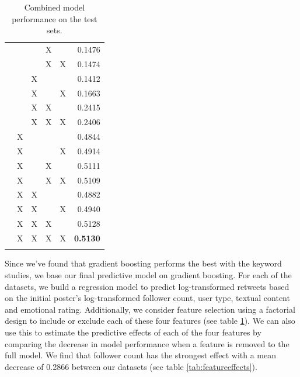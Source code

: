 \begin{longtable}{l|c|c|c|c|r}
                           &           &           & X    &         & 0.1476                           \\ \cline{2-6} 
                           &           &           & X    & X       & 0.1474                           \\ \cline{2-6} 
                           &           & X         &      &         & 0.1412                           \\ \cline{2-6} 
                           &           & X         &      & X       & 0.1663                           \\ \cline{2-6} 
                           &           & X         & X    &         & 0.2415                           \\ \cline{2-6} 
                           &           & X         & X    & X       & 0.2406                           \\ \cline{2-6} 
                           & X         &           &      &         & 0.4844                           \\ \cline{2-6} 
                           & X         &           &      & X       & 0.4914                           \\ \cline{2-6} 
                           & X         &           & X    &         & 0.5111                           \\ \cline{2-6} 
                           & X         &           & X    & X       & 0.5109                           \\ \cline{2-6} 
                           & X         & X         &      &         & 0.4882                           \\ \cline{2-6} 
                           & X         & X         &      & X       & 0.4940                           \\ \cline{2-6} 
                           & X         & X         & X    &         & 0.5128                           \\ \cline{2-6} 
                           & X         & X         & X    & X       & \textbf{0.5130}                           \\ \hline
\caption{Combined model performance on the test sets.}
\label{tab:combinedfeatures}
\end{longtable}

Since we've found that gradient boosting performs the best with the keyword studies, we base our final predictive model on gradient boosting. For each of the datasets, we build a regression model to predict log-transformed retweets based on the initial poster's log-transformed follower count, user type, textual content and emotional rating. Additionally, we consider feature selection using a factorial design to include or exclude each of these four features (see table \ref{tab:combinedfeatures}). We can also use this to estimate the predictive effects of each of the four features by comparing the decrease in model performance when a feature is removed to the full model. We find that follower count has the strongest effect with a mean decrease of 0.2866 between our datasets (see table \ref{tab:featureeffects}). 

